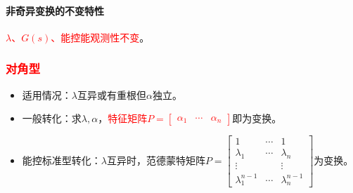 \documentclass[
12pt, %
a4paper, 
oneside, %
]{scrartcl}
\begin{document}
\paragraph{非奇异变换的不变特性}
\textcolor{red}{$ \lambda $、$ G(s) $、能控能观测性不变}。
\subsubsection[对角型]{\textcolor{red}{对角型}}
\begin{itemize}
\item 适用情况：$ \lambda $互异或有重根但$ \alpha $独立。
\item 一般转化：求$ \lambda, \alpha $，\textcolor{red}{特征矩阵$ P = \begin{bmatrix} \alpha_1 & \cdots & \alpha_n \end{bmatrix} $}即为变换。
\item 能控标准型转化：$ \lambda $互异时，范德蒙特矩阵$ P = \begin{bmatrix} 1 & \cdots & 1 \\ \lambda_1 & \cdots & \lambda_n \\ \vdots & & \vdots \\ \lambda_1^{n - 1} & \cdots & \lambda_n^{n - 1} \end{bmatrix} $为变换。
\end{itemize}
\end{document}
